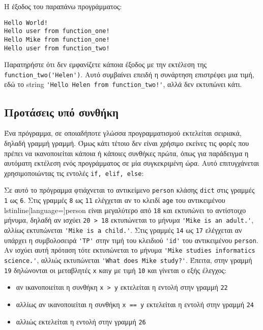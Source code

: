 \documentclass[14pt]{extreport}
\begin{document}
Η έξοδος του παραπάνω προγράμματος:

\begin{lstlisting}[language={}]
Hello World!
Hello user from function_one!
Hello Mike from function_one!
Hello user from function_two!
\end{lstlisting}

Παρατηρήστε ότι δεν εμφανίζετε κάποια έξοδος με την εκτέλεση της \lstinline{function_two('Helen')}. Αυτό συμβαίνει επειδή η συνάρτηση επιστρέφει μια τιμή, εδώ το string \lstinline{'Hello Helen from function_two!'}, αλλά δεν εκτυπώνει κάτι.

\subsection{Προτάσεις υπό συνθήκη}
Ένα πρόγραμμα, σε οποιαδήποτε γλώσσα προγραμματισμού εκτελείται σειριακά, δηλαδή γραμμή γραμμή. Όμως κάτι τέτοιο δεν είναι χρήσιμο εκείνες τις φορές που πρέπει να ικανοποιείται κάποια ή κάποιες συνθήκες πρώτα, όπως για παράδειγμα η αυτόματη εκτέλεση ενός προγράμματος σε μία συγκεκριμένη ώρα. Αυτό επιτυγχάνεται χρησιμοποιώντας τις εντολές \lstinline{if, elif, else}:



Σε αυτό το πρόγραμμα φτιάχνεται το αντικείμενο \lstinline{person} κλάσης \lstinline{dict} στις γραμμές \lstinline{1} ως \lstinline{6}. Στις γραμμές \lstinline{8} ως \lstinline{11} ελέγχεται αν το κλειδί \lstinline[language={}]{age} του αντικειμένου lstinline[language={}]{person} είναι μεγαλύτερο από \lstinline{18} και εκτυπώνει το αντίστοιχο μήνυμα, δηλαδή αν ισχύει \lstinline{20 > 18} εκτυπώνεται το μήνυμα \lstinline[language={}]{'Mike is an adult.'}, αλλίως εκτυπώνεται \lstinline[language={}]{'Mike is a child.'}. Στις γραμμές \lstinline{14} ως \lstinline{17} ελέγχεται αν υπάρχει η συμβολοσειρά \lstinline[language={}]{'TP'} στην τιμή του κλειδιού \lstinline[language={}]{'id'} του αντικειμένου \lstinline[language={}]{person}. Αν ισχύει αυτή πρόταση τότε εκτυπώνεται το μήνυμα \lstinline[language={}]{'Mike studies informatics science.'}, αλλιώς εκτυπώνεται \lstinline[language={}]{'What does Mike study?'}. Έπειτα, στην γραμμή \lstinline{19} δηλώνονται οι μεταβλητές \lstinline{x} και\lstinline{y} με τιμή \lstinline{10} και γίνεται ο εξής έλεγχος:
\begin{itemize}
    \itemsep0cm
    \item αν ικανοποιείται η συνθήκη \lstinline{x > y} εκτελείται η εντολή στην γραμμή \lstinline{22}
    \item αλλίως αν ικανοποιείται η συνθήκη \lstinline{x == y} εκτελείται η εντολή στην γραμμή \lstinline{24}
    \item αλλιώς εκτελείται η εντολή στην γραμμή \lstinline{26}
\end{itemize}
\end{document}
